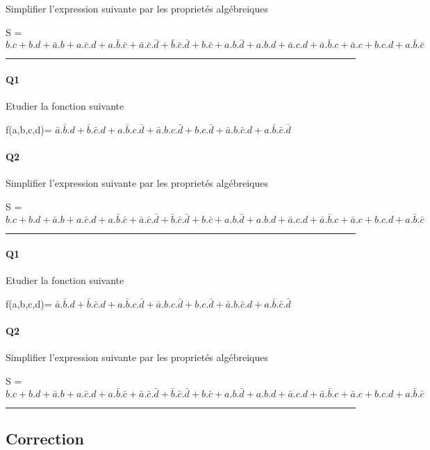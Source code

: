 Simplifier l'expression suivante par les proprietés algébreiques 

S = $ b.c + b.d + \bar a.b + a.\bar c.d + a.\bar b.\bar c + \bar a.\bar c.\bar d + \bar b.\bar c.\bar d  +  b.\bar c + a.b.\bar d  +  a.b.d + \bar a.c.d + \bar a.\bar b.c  +  \bar a.c + b.c.d + a.\bar b.\bar c $

\hrule width 1\linewidth
\paragraph{Q1}

Etudier la fonction suivante

f(a,b,c,d)= $ \bar a.\bar b.d + \bar b.\bar c.d + a.\bar b.c.\bar d + \bar a.b.c.\bar d  +  b.c.\bar d + \bar a.b.\bar c.d + a.\bar b.\bar c.\bar d $

\paragraph{Q2}

Simplifier l'expression suivante par les proprietés algébreiques 

S = $ b.c + b.d + \bar a.b + a.\bar c.d + a.\bar b.\bar c + \bar a.\bar c.\bar d + \bar b.\bar c.\bar d  +  b.\bar c + a.b.\bar d  +  a.b.d + \bar a.c.d + \bar a.\bar b.c  +  \bar a.c + b.c.d + a.\bar b.\bar c $

\hrule width 1\linewidth
\paragraph{Q1}

Etudier la fonction suivante

f(a,b,c,d)= $ \bar a.\bar b.d + \bar b.\bar c.d + a.\bar b.c.\bar d + \bar a.b.c.\bar d  +  b.c.\bar d + \bar a.b.\bar c.d + a.\bar b.\bar c.\bar d $

\paragraph{Q2}

Simplifier l'expression suivante par les proprietés algébreiques 

S = $ b.c + b.d + \bar a.b + a.\bar c.d + a.\bar b.\bar c + \bar a.\bar c.\bar d + \bar b.\bar c.\bar d  +  b.\bar c + a.b.\bar d  +  a.b.d + \bar a.c.d + \bar a.\bar b.c  +  \bar a.c + b.c.d + a.\bar b.\bar c $

\hrule width 1\linewidth\pagebreak
\subsection{Correction}

